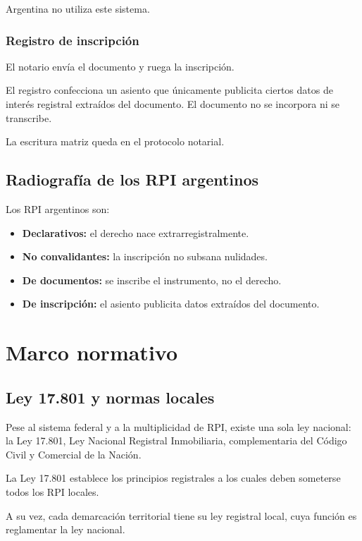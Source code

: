 \documentclass[12pt]{book}
\begin{document}
Argentina no utiliza este sistema.

\subsubsection{Registro de inscripci\'on}

El notario env\'ia el documento y ruega la inscripci\'on.

El registro confecciona un asiento que \'unicamente publicita ciertos datos de inter\'es registral extra\'idos del documento. El documento no se incorpora ni se transcribe.

La escritura matriz queda en el protocolo notarial.

\subsection{Radiograf\'ia de los RPI argentinos}

Los RPI argentinos son:

\begin{itemize}
    \item \textbf{Declarativos:} el derecho nace extrarregistralmente.
    \item \textbf{No convalidantes:} la inscripci\'on no subsana nulidades.
    \item \textbf{De documentos:} se inscribe el instrumento, no el derecho.
    \item \textbf{De inscripci\'on:} el asiento publicita datos extra\'idos del documento.
\end{itemize}

\section{Marco normativo}

\subsection{Ley 17.801 y normas locales}

Pese al sistema federal y a la multiplicidad de RPI, existe una sola ley nacional: la Ley 17.801, Ley Nacional Registral Inmobiliaria, complementaria del C\'odigo Civil y Comercial de la Naci\'on.

La Ley 17.801 establece los principios registrales a los cuales deben someterse todos los RPI locales.

A su vez, cada demarcaci\'on territorial tiene su ley registral local, cuya funci\'on es reglamentar la ley nacional.
\end{document}
